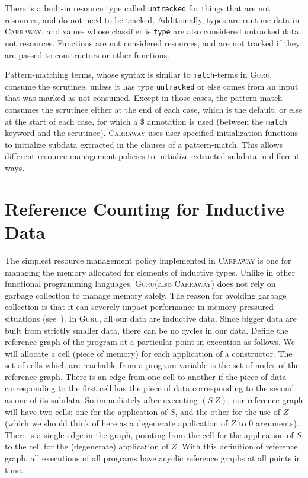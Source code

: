 \documentclass{book}[12pt]
\newcommand{\guru}[0]{\textsc{Guru}\xspace}
\newcommand{\carraway}[0]{\textsc{Carraway}\xspace}
\begin{document}
There is a built-in resource type called \texttt{untracked} for things
that are not resources, and do not need to be tracked.  Additionally,
types are runtime data in \carraway, and values whose classifier is
\texttt{type} are also considered untracked data, not resources.
Functions are not considered resources, and are not tracked if they
are passed to constructors or other functions.

Pattern-matching terms, whose syntax is similar to
\texttt{match}-terms in \guru, consume the scrutinee, unless it has
type \texttt{untracked} or else comes from an input that was marked as
not consumed.  Except in those cases, the pattern-match consumes the
scrutinee either at the end of each case, which is the default; or
else at the start of each case, for which a \$ annotation is used
(between the \texttt{match} keyword and the scrutinee).  \carraway
uses user-specified initialization functions to initialize subdata
extracted in the clauses of a pattern-match.  This allows different
resource management policies to initialize extracted subdata in
different ways.

\section{Reference Counting for Inductive Data}

The simplest resource management policy implemented in \carraway is
one for managing the memory allocated for elements of inductive types.
Unlike in other functional programming languages, \guru (also
\carraway) does not rely on garbage collection to manage memory
safely.  The reason for avoiding garbage collection is that it can
severely impact performance in memory-pressured situations
(see~\cite{xian08,hertz+05}).  In \guru, all our data are inductive
data.  Since bigger data are built from strictly smaller data, there
can be no cycles in our data.  Define the reference graph of the
program at a particular point in execution as follows.  We will
allocate a cell (piece of memory) for each application of a
constructor.  The set of cells which are reachable from a program
variable is the set of nodes of the reference graph.  There is an edge
from one cell to another if the piece of data corresponding to the
first cell has the piece of data corresponding to the second as one of
its subdata.  So immediately after executing $(S\ Z)$, our reference
graph will have two cells: one for the application of $S$, and the
other for the use of $Z$ (which we should think of here as a
degenerate application of $Z$ to $0$ arguments).  There is a single
edge in the graph, pointing from the cell for the application of $S$
to the cell for the (degenerate) application of $Z$.  With this
definition of reference graph, all executions of all programs have
acyclic reference graphs at all points in time.
\end{document}
